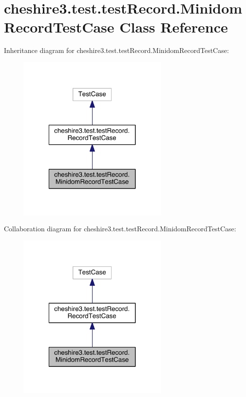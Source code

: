 \hypertarget{classcheshire3_1_1test_1_1test_record_1_1_minidom_record_test_case}{\section{cheshire3.\-test.\-test\-Record.\-Minidom\-Record\-Test\-Case Class Reference}
\label{classcheshire3_1_1test_1_1test_record_1_1_minidom_record_test_case}
}


Inheritance diagram for cheshire3.\-test.\-test\-Record.\-Minidom\-Record\-Test\-Case\-:
\nopagebreak
\begin{figure}[H]
\begin{center}
\leavevmode
\includegraphics[width=212pt]{classcheshire3_1_1test_1_1test_record_1_1_minidom_record_test_case__inherit__graph}
\end{center}
\end{figure}


Collaboration diagram for cheshire3.\-test.\-test\-Record.\-Minidom\-Record\-Test\-Case\-:
\nopagebreak
\begin{figure}[H]
\begin{center}
\leavevmode
\includegraphics[width=212pt]{classcheshire3_1_1test_1_1test_record_1_1_minidom_record_test_case__coll__graph}
\end{center}
\end{figure}
